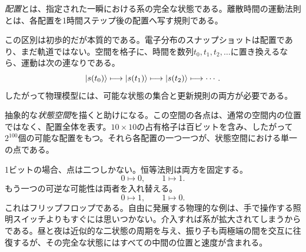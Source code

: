 \begin{definition}
\emph{配置}とは、指定された一瞬における系の完全な状態である。離散時間の運動法則とは、各配置を1時間ステップ後の配置へ写す規則である。
\end{definition}

この区別は初歩的だが本質的である。電子分布のスナップショットは配置であり、まだ軌道ではない。空間を格子に、時間を数列\(t_0,t_1,t_2,\ldots\)に置き換えるなら、運動は次の連なりである。
\begin{equation}
  \left\lvert s(t_0)\right\rangle
  \longmapsto
  \left\lvert s(t_1)\right\rangle
  \longmapsto
  \left\lvert s(t_2)\right\rangle
  \longmapsto\cdots.
  \label{eq:l01-discrete-motion}
\end{equation}
したがって物理模型には、可能な状態の集合と更新規則の両方が必要である。

\begin{classroomqa}
\end{classroomqa}

抽象的な\emph{状態空間}を描くと助けになる。この空間の各点は、通常の空間内の位置ではなく、配置全体を表す。\(10\times10\)の占有格子は百ビットを含み、したがって\(2^{100}\)個の可能な配置をもつ。それら各配置の一つ一つが、状態空間における単一の点である。

1ビットの場合、点は二つしかない。恒等法則は両方を固定する。
\begin{equation}
  0\mapsto0,
  \qquad
  1\mapsto1.
  \label{eq:l01-identity-update}
\end{equation}
もう一つの可逆な可能性は両者を入れ替える。
\begin{equation}
  0\mapsto1,
  \qquad
  1\mapsto0.
  \label{eq:l01-flip-update}
\end{equation}
これはフリップフロップである。自由に発展する物理的な例は、手で操作する照明スイッチよりもすぐには思いつかない。介入すれば系が拡大されてしまうからである。昼と夜は近似的な二状態の周期を与え、振り子も両極端の間を交互に往復するが、その完全な状態にはすべての中間の位置と速度が含まれる。


